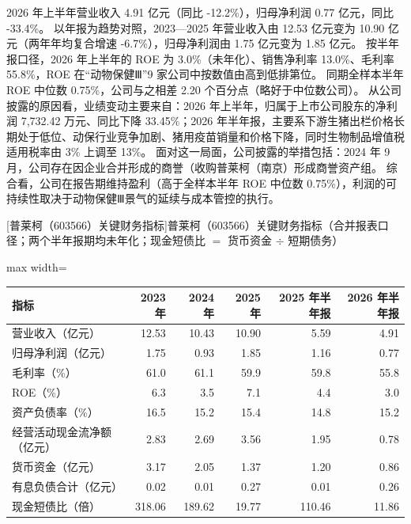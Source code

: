  2026 年上半年营业收入 4.91 亿元（同比 -12.2\%），归母净利润 0.77 亿元，同比 -33.4\%。 以年报为趋势对照，2023---2025 年营业收入由 12.53 亿元变为 10.90 亿元（两年年均复合增速 -6.7\%），归母净利润由 1.75 亿元变为 1.85 亿元。 按半年报口径，2026 年上半年的 ROE 为 3.0\%（未年化）、销售净利率 13.0\%、毛利率 55.8\%，ROE 在“动物保健Ⅲ”9 家公司中按数值由高到低排第位。 同期全样本半年 ROE 中位数 0.75\%，公司与之相差 2.20 个百分点（略好于中位数公司）。 从公司披露的原因看，业绩变动主要来自：2026 年上半年，归属于上市公司股东的净利润 7,732.42 万元、同比下降 33.45\%；2026 年半年报，主要系下游生猪出栏价格长期处于低位、动保行业竞争加剧、猪用疫苗销量和价格下降，同时生物制品增值税适用税率由 3\% 上调至 13\%。 面对这一局面，公司披露的举措包括：2024 年 9 月，公司存在因企业合并形成的商誉（收购普莱柯（南京）形成商誉资产组。 综合看，公司在报告期维持盈利（高于全样本半年 ROE 中位数 0.75\%），利润的可持续性取决于动物保健Ⅲ景气的延续与成本管控的执行。

\begin{center}\small\setlength{\tabcolsep}{3.4pt}
[普莱柯（603566）关键财务指标]{普莱柯（603566）关键财务指标（合并报表口径；两个半年报期均未年化；现金短债比 $=$ 货币资金 $\div$ 短期债务）}
\begin{adjustbox}{max width=\textwidth}
\begin{tabular}{@{}lrrrrr@{}}
\toprule
指标 & 2023 年 & 2024 年 & 2025 年 & 2025 年半年报 & 2026 年半年报 \\
\midrule
营业收入（亿元） & 12.53 & 10.43 & 10.90 & 5.59 & 4.91 \\
归母净利润（亿元） & 1.75 & 0.93 & 1.85 & 1.16 & 0.77 \\
毛利率（\%） & 61.0 & 61.1 & 59.9 & 59.8 & 55.8 \\
ROE（\%） & 6.3 & 3.5 & 7.1 & 4.4 & 3.0 \\
资产负债率（\%） & 16.5 & 15.2 & 15.4 & 14.8 & 15.2 \\
经营活动现金流净额（亿元） & 2.83 & 2.69 & 3.56 & 1.95 & 0.78 \\
货币资金（亿元） & 3.17 & 2.05 & 1.37 & 1.20 & 0.86 \\
有息负债合计（亿元） & 0.02 & 0.01 & 0.27 & 0.01 & 0.26 \\
现金短债比（倍） & 318.06 & 189.62 & 19.77 & 110.46 & 11.86 \\
\bottomrule
\end{tabular}
\end{adjustbox}
\end{center}

